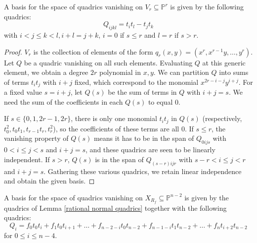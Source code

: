 \documentclass{report}
\begin{document}
\begin{lemma} \label{rational normal quadrics}
A basis for the space of quadrics vanishing on $V_r \subseteq \mathbb{P}^r$ is given by the following quadrics:
\begin{equation}
Q_{ijkl} = t_i t_l - t_j t_k
\end{equation}
with $i < j \leq k < l, i+l = j+k$, $i=0$ if $s \leq r$ and $l = r$ if $s > r$.
\end{lemma}

\begin{proof}
$V_r$ is the collection of elements of the form $q_r(x,y) = ( x^r, x^{r-1} y, \ldots, y^r )$.  Let $Q$ be a quadric vanishing on all such elements.  Evaluating $Q$ at this generic element, we obtain a degree $2r$ polynomial in $x,y$.  We can partition $Q$ into sums of terms $t_i t_j$ with $i+j$ fixed, which correspond to the monomial $x^{2r-i-j} y^{i+j}$.  For a fixed value $s = i+j$, let $Q(s)$ be the sum of terms in $Q$ with $i+j = s$.  We need the sum of the coefficients in each $Q(s)$ to equal 0.

If $s \in \{ 0,1,2r-1,2r \}$, there is only one monomial $t_i t_j$ in $Q(s)$ (respectively, $t_0^2, t_0 t_1, t_{r-1} t_r, t_r^2$), so the coefficients of these terms are all 0.  If $s \leq r$, the vanishing property of $Q(s)$ means it has to be in the span of $Q_{0ijs}$ with $0 < i \leq j < s$ and $i+j = s$, and these quadrics are seen to be linearly independent.  If $s > r$, $Q(s)$ is in the span of $Q_{(s-r)ijr}$ with $s-r < i \leq j < r$ and $i+j = s$.  Gathering these various quadrics, we retain linear independence and obtain the given basis.
\end{proof}

\begin{lemma} \label{R_f quadrics}
A basis for the space of quadrics vanishing on $X_{R_f} \subseteq \mathbb{P}^{n-2}$ is given by the quadrics of Lemma \ref{rational normal quadrics} together with the following quadrics:
\begin{equation}
Q_i = f_0 t_0 t_i + f_1 t_0 t_{i+1} + \ldots + f_{n-2-i} t_0 t_{n-2} + f_{n-1-i} t_1 t_{n-2} + \ldots + f_n t_{i+2} t_{n-2}
\end{equation}
for $0 \leq i \leq n-4$.
\end{lemma}
\end{document}
